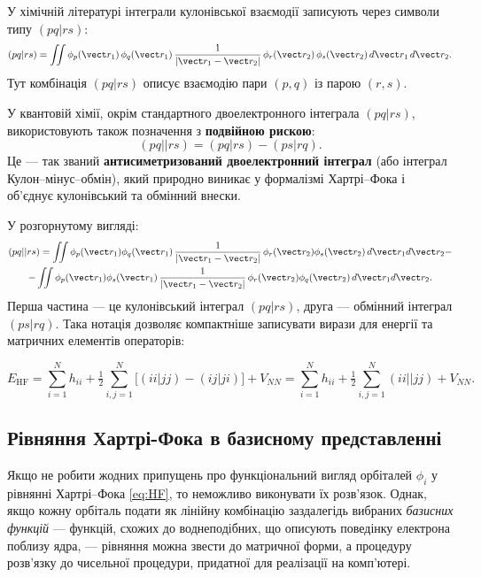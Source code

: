\begin{commentbox}
	У хімічній літературі інтеграли кулонівської взаємодії записують через
	символи типу $(pq|rs)$:
	\[
		(pq|rs) =
		\iint
		\phi_p(\vect r_1)\,
		\phi_q(\vect r_1)\,
		\frac{1}{|\vect r_1 - \vect r_2|}\,
		\phi_r(\vect r_2)\,
		\phi_s(\vect r_2)\,
		d\vect r_1\, d\vect r_2.
	\]
	Тут комбінація $(pq|rs)$ описує взаємодію пари $(p,q)$ із парою $(r,s)$.

	У квантовій хімії, окрім стандартного двоелектронного інтеграла
	$(pq|rs)$,
	використовують також позначення з \textbf{подвійною рискою}:
	\[
		(pq||rs) = (pq|rs) - (ps|rq).
	\]
	Це --- так званий \textbf{антисиметризований двоелектронний інтеграл}
	(або інтеграл Кулон–мінус–обмін), який природно виникає у формалізмі
	Хартрі–Фока і об'єднує кулонівський та обмінний внески.

	У розгорнутому вигляді:
	\begin{multline*}
		(pq||rs)
		=
		\iint
		\phi_p(\vect r_1)\phi_q(\vect r_1)\,
		\frac{1}{|\vect r_1 - \vect r_2|}\,
		\phi_r(\vect r_2)\phi_s(\vect r_2)\,
		d\vect r_1 d\vect r_2
		- \\ -
		\iint
		\phi_p(\vect r_1)\phi_s(\vect r_1)\,
		\frac{1}{|\vect r_1 - \vect r_2|}\,
		\phi_r(\vect r_2)\phi_q(\vect r_2)\,
		d\vect r_1 d\vect r_2.
	\end{multline*}
	Перша частина --- це кулонівський інтеграл $(pq|rs)$,
	друга --- обмінний інтеграл $(ps|rq)$.
	Така нотація дозволяє компактніше записувати вирази для енергії та матричних елементів операторів:

	\begin{equation*}
		E_{\mathrm{HF}} = \sum_{i=1}^{N} h_{ii}
		+ \tfrac{1}{2}\sum_{i,j=1}^{N} \bigl[(ii|jj) - (ij|ji)\bigr] + V_{NN} = \sum_{i=1}^{N} h_{ii}
		+ \tfrac{1}{2}\sum_{i,j=1}^{N} (ii||jj) + V_{NN}.
	\end{equation*}
\end{commentbox}

\subsection{Рівняння Хартрі-Фока в базисному представленні}

Якщо не робити жодних припущень про функціональний вигляд орбіталей $\phi_i$ у рівнянні Хартрі–Фока \eqref{eq:HF}, то неможливо виконувати їх розв'язок. Однак, якщо кожну орбіталь подати як лінійну комбінацію заздалегідь вибраних \emph{базисних функцій} --- функцій, схожих до воднеподібних, що описують поведінку електрона поблизу ядра, --- рівняння можна звести до матричної форми, а процедуру розв'язку до чисельної процедури, придатної для реалізації на комп'ютері.


